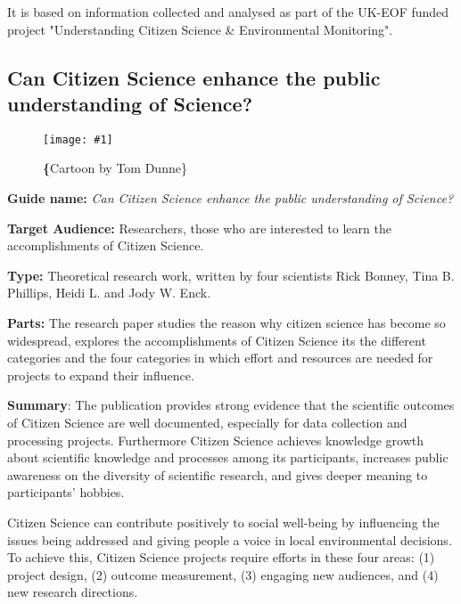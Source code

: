 \documentclass{article}
\newlength{\imgwidth}
\newcommand\scaledgraphics[2]{%
                
\settowidth{\imgwidth}{\texttt{[image: \#1]}}%
                
\setlength{\imgwidth}{\minof{\imgwidth}{#2\textwidth}}%
                
\texttt{[image: \#1]}%
                
}
\begin{document}
It is based on information collected and analysed as part of the UK-EOF funded project "Understanding Citizen Science \& Environmental Monitoring".


\subsection{Can Citizen Science enhance the public understanding of Science?}\label{H2333653}



\begin{center}
\begin{figure}
\scaledgraphics{fb9872a4-8371-4bfe-a930-f1d621c5649e.png}{0.75}
\caption*{\textbf\{Cartoon by Tom Dunne\}}\label{F26530171}
\end{figure}


\end{center}





\textbf{Guide name: }\emph{Can Citizen Science enhance the public understanding of Science?}\textbf{ } \autocite{bonney_can_2015}


\textbf{Target Audience: }Researchers, those who are interested to learn the accomplishments of Citizen Science.


\textbf{Type: }Theoretical research work, written by four scientists Rick Bonney, Tina B. Phillips, Heidi L. and Jody W. Enck.


\textbf{Parts: }The research paper studies the reason why citizen science has become so widespread, explores the accomplishments of Citizen Science its the different categories and the four categories in which effort and resources are needed for projects to expand their influence.


\textbf{Summary}: The publication provides strong evidence that the scientific outcomes of Citizen Science are well documented, especially for data collection and processing projects. Furthermore Citizen Science achieves knowledge growth about scientific knowledge and processes among its participants, increases public awareness on the diversity of scientific research, and gives deeper meaning to participants' hobbies.


Citizen Science can contribute positively to social well-being by influencing the issues being addressed and giving people a voice in local environmental decisions. To achieve this, Citizen Science projects require efforts in these four areas: (1) project design, (2) outcome measurement, (3) engaging new audiences, and (4) new research directions.


\printbibliography[title={Bibliography}]
\end{document}
